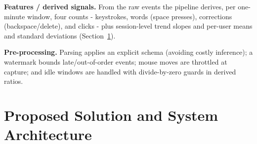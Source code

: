 \documentclass[conference]{IEEEtran}
\begin{document}
\textbf{Features / derived signals.} From the raw events the pipeline
derives, per one-minute window, four counts - keystrokes, words (space
presses), corrections (backspace/delete), and clicks - plus
session-level trend slopes and per-user means and standard deviations
(Section~\ref{sec:arch}).

\textbf{Pre-processing.} Parsing applies an explicit schema (avoiding
costly inference); a watermark bounds late/out-of-order events; mouse
moves are throttled at capture; and idle windows are handled with
divide-by-zero guards in derived ratios.

\section{Proposed Solution and System Architecture}
\label{sec:arch}
\end{document}
